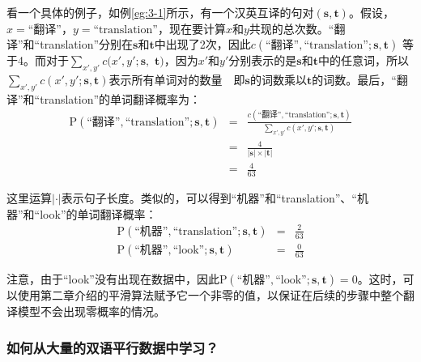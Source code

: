 \parinterval 看一个具体的例子，如例\ref{eg:3-1}所示，有一个汉英互译的句对$(\mathbf{s},\mathbf{t})$。假设，$x=\textrm{``翻译''}$，$y=\textrm{``translation''}$，现在要计算$x$和$y$共现的总次数。``翻译''和``translation''分别在$\mathbf{s}$和$\mathbf{t}$中出现了2次，因此$c(\textrm{``翻译''},\textrm{``translation''};\mathbf{s},\mathbf{t})$ 等于4。而对于$\sum_{x',y'} c(x',y';\mathbf{s},$ $\mathbf{t})$，因为$x'$和$y'$分别表示的是$\mathbf{s}$和$\mathbf{t}$中的任意词，所以$\sum_{x',y'} c(x',y';\mathbf{s},\mathbf{t})$表示所有单词对的数量\ \dash \ 即$\mathbf{s}$的词数乘以$\mathbf{t}$的词数。最后，``翻译''和``translation''的单词翻译概率为：
\begin{eqnarray}
\textrm{P}(\text{``翻译''},\text{``translation''}; \mathbf{s},\mathbf{t})  & = & \frac{c(\textrm{``翻译''},\textrm{``translation''};\mathbf{s},\mathbf{t})}{\sum_{x',y'} c(x',y';\mathbf{s},\mathbf{t})} \nonumber \\
                                                                                                         & =  & \frac{4}{|\mathbf{s}|\times |\mathbf{t}|} \nonumber \\
                                                                                                         & = & \frac{4}{63}
\label{eq:3-2}
\end{eqnarray}

\noindent 这里运算$|\cdot|$表示句子长度。类似的，可以得到``机器''和``translation''、``机器''和``look''的单词翻译概率：
\begin{eqnarray}
\textrm{P}(\text{``机器''},\text{``translation''}; \mathbf{s},\mathbf{t})  & = & \frac{2}{63} \\
\textrm{P}(\text{``机器''},\text{``look''}; \mathbf{s},\mathbf{t})  & =  & \frac{0}{63}
\label{eq:3-3}
\end{eqnarray}

\noindent 注意，由于``look''没有出现在数据中，因此$\textrm{P}(\text{``机器''},\text{``look''}; \mathbf{s},\mathbf{t})=0$。这时，可以使用第二章介绍的平滑算法赋予它一个非零的值，以保证在后续的步骤中整个翻译模型不会出现零概率的情况。


\subsubsection{如何从大量的双语平行数据中学习？}

